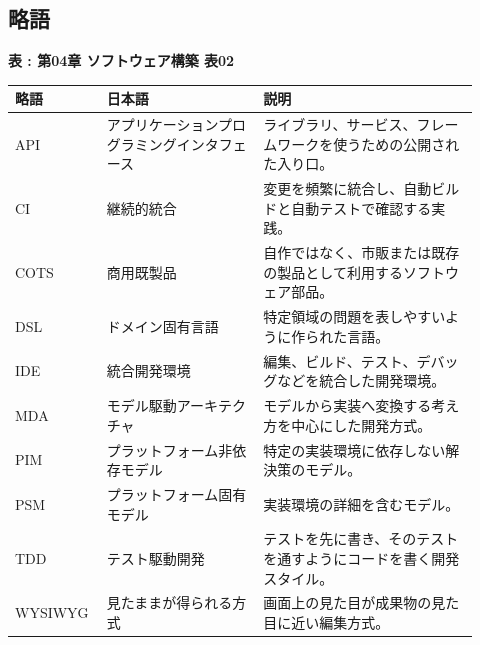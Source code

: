 \subsection*{略語}

\par\smallskip\noindent{}\label{tab:ch04-02}\textbf{表 \thetable: 第04章 ソフトウェア構築 表02}\par\smallskip
\begin{longtable}{L{0.16\linewidth}L{0.32\linewidth}L{0.44\linewidth}}
\toprule
\textbf{略語} & \textbf{日本語} & \textbf{説明} \\
\midrule
API & アプリケーションプログラミングインタフェース & ライブラリ、サービス、フレームワークを使うための公開された入り口。 \\
CI & 継続的統合 & 変更を頻繁に統合し、自動ビルドと自動テストで確認する実践。 \\
COTS & 商用既製品 & 自作ではなく、市販または既存の製品として利用するソフトウェア部品。 \\
DSL & ドメイン固有言語 & 特定領域の問題を表しやすいように作られた言語。 \\
IDE & 統合開発環境 & 編集、ビルド、テスト、デバッグなどを統合した開発環境。 \\
MDA & モデル駆動アーキテクチャ & モデルから実装へ変換する考え方を中心にした開発方式。 \\
PIM & プラットフォーム非依存モデル & 特定の実装環境に依存しない解決策のモデル。 \\
PSM & プラットフォーム固有モデル & 実装環境の詳細を含むモデル。 \\
TDD & テスト駆動開発 & テストを先に書き、そのテストを通すようにコードを書く開発スタイル。 \\
WYSIWYG & 見たままが得られる方式 & 画面上の見た目が成果物の見た目に近い編集方式。 \\
\bottomrule
\end{longtable}

